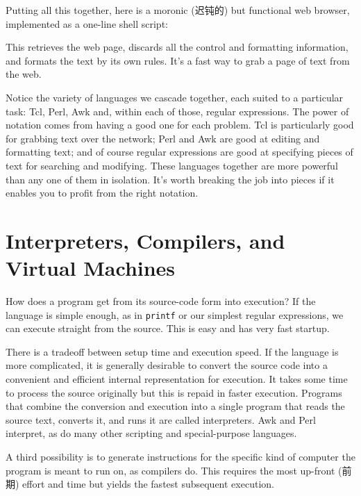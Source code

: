 Putting all this together, here is a moronic (迟钝的) but functional web
browser, implemented as a one-line shell script:
This retrieves the web page, discards all the control and formatting
information, and formats the text by its own rules. It's a fast way to grab
a page of text from the web.

Notice the variety of languages we cascade together, each suited to a
particular task: Tcl, Perl, Awk and, within each of those, regular
expressions. The power of notation comes from having a good one for each
problem. Tcl is particularly good for grabbing text over the network; Perl
and Awk are good at editing and formatting text; and of course regular
expressions are good at specifying pieces of text for searching and
modifying. These languages together are more powerful than any one of them
in isolation. It's worth breaking the job into pieces if it enables you to
profit from the right notation.

\section{Interpreters, Compilers, and Virtual Machines}
\label{sec:interpreters_compilers_and_virtual_machines}

How does a program get from its source-code form into execution? If the
language is simple enough, as in \verb'printf' or our simplest regular
expressions, we can execute straight from the source. This is easy and has
very fast startup.

There is a tradeoff between setup time and execution speed. If the language
is more complicated, it is generally desirable to convert the source code
into a convenient and efficient internal representation for execution. It
takes some time to process the source originally but this is repaid in
faster execution. Programs that combine the conversion and execution into a
single program that reads the source text, converts it, and runs it are
called interpreters. Awk and Perl interpret, as do many other scripting and
special-purpose languages.

A third possibility is to generate instructions for the specific kind of
computer the program is meant to run on, as compilers do. This requires the
most up-front (前期) effort and time but yields the fastest subsequent
execution.

